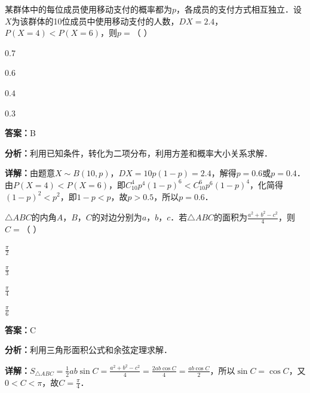 \begin{question}[points=5]
某群体中的每位成员使用移动支付的概率都为$p$，各成员的支付方式相互独立．设$X$为该群体的10位成员中使用移动支付的人数，$DX=2.4$，$P(X=4)<P(X=6)$，则$p=$（ ）
\begin{choices}
  \item $0.7$
  \item $0.6$
  \item $0.4$
  \item $0.3$
\end{choices}
\begin{solution}
\textbf{答案：}B

\textbf{分析：}利用已知条件，转化为二项分布，利用方差和概率大小关系求解．

\textbf{详解：}由题意$X\sim B(10,p)$，$DX=10p(1-p)=2.4$，解得$p=0.6$或$p=0.4$．由$P(X=4)<P(X=6)$，即$C_{10}^4 p^4(1-p)^6 < C_{10}^6 p^6(1-p)^4$，化简得$(1-p)^2 < p^2$，即$1-p < p$，故$p>0.5$，所以$p=0.6$．
\end{solution}
\end{question}

\begin{question}[points=5]
$\triangle ABC$的内角$A$，$B$，$C$的对边分别为$a$，$b$，$c$．若$\triangle ABC$的面积为$\frac{a^2+b^2-c^2}{4}$，则$C=$（ ）
\begin{choices}
  \item $\frac{\pi}{2}$
  \item $\frac{\pi}{3}$
  \item $\frac{\pi}{4}$
  \item $\frac{\pi}{6}$
\end{choices}
\begin{solution}
\textbf{答案：}C

\textbf{分析：}利用三角形面积公式和余弦定理求解．

\textbf{详解：}$S_{\triangle ABC}=\frac{1}{2}ab\sin C = \frac{a^2+b^2-c^2}{4} = \frac{2ab\cos C}{4} = \frac{ab\cos C}{2}$，所以$\sin C = \cos C$，又$0<C<\pi$，故$C=\frac{\pi}{4}$．
\end{solution}
\end{question}

